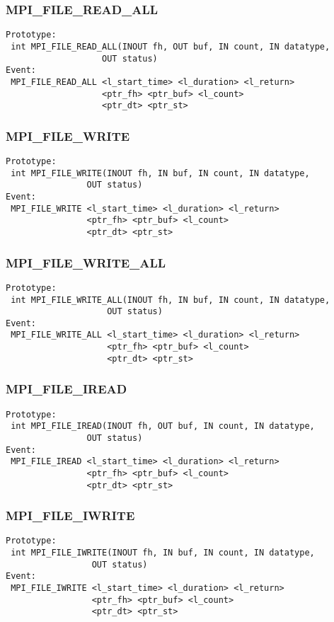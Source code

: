 \documentclass[9pt]{article}
\begin{document}
\subsubsection{MPI\_FILE\_READ\_ALL}
\label{sec:MPIFILEREADALL}
\begin{verbatim}
Prototype:
 int MPI_FILE_READ_ALL(INOUT fh, OUT buf, IN count, IN datatype, 
                   OUT status)
Event:
 MPI_FILE_READ_ALL <l_start_time> <l_duration> <l_return>
                   <ptr_fh> <ptr_buf> <l_count>
                   <ptr_dt> <ptr_st>
\end{verbatim}

\subsubsection{MPI\_FILE\_WRITE}
\label{sec:MPIFILEWRITE}
\begin{verbatim}
Prototype:
 int MPI_FILE_WRITE(INOUT fh, IN buf, IN count, IN datatype, 
                OUT status)
Event:
 MPI_FILE_WRITE <l_start_time> <l_duration> <l_return>
                <ptr_fh> <ptr_buf> <l_count>
                <ptr_dt> <ptr_st>
\end{verbatim}

\subsubsection{MPI\_FILE\_WRITE\_ALL}
\label{sec:MPIFILEWRITEALL}
\begin{verbatim}
Prototype:
 int MPI_FILE_WRITE_ALL(INOUT fh, IN buf, IN count, IN datatype, 
                    OUT status)
Event:
 MPI_FILE_WRITE_ALL <l_start_time> <l_duration> <l_return>
                    <ptr_fh> <ptr_buf> <l_count>
                    <ptr_dt> <ptr_st>
\end{verbatim}

\subsubsection{MPI\_FILE\_IREAD}
\label{sec:MPIFILEIREAD}
\begin{verbatim}
Prototype:
 int MPI_FILE_IREAD(INOUT fh, OUT buf, IN count, IN datatype, 
                OUT status)
Event:
 MPI_FILE_IREAD <l_start_time> <l_duration> <l_return>
                <ptr_fh> <ptr_buf> <l_count>
                <ptr_dt> <ptr_st>
\end{verbatim}

\subsubsection{MPI\_FILE\_IWRITE}
\label{sec:MPIFILEIWRITE}
\begin{verbatim}
Prototype:
 int MPI_FILE_IWRITE(INOUT fh, IN buf, IN count, IN datatype, 
                 OUT status)
Event:
 MPI_FILE_IWRITE <l_start_time> <l_duration> <l_return>
                 <ptr_fh> <ptr_buf> <l_count>
                 <ptr_dt> <ptr_st>
\end{verbatim}
\end{document}
